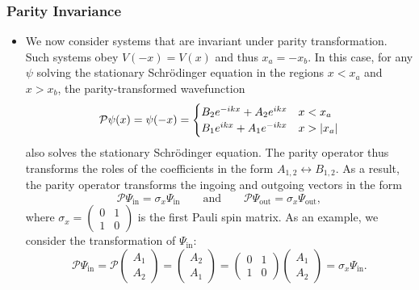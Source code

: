 \documentclass[11pt, a4paper]{article}
\newcommand{\Schro}{Schr\"{o}dinger\xspace}
\newcommand{\Par}{\mathcal{P}}  %
\begin{document}
\subsubsection{Parity Invariance}
\begin{itemize}
    \item We now consider systems that are invariant under parity transformation. Such systems obey $ V(-x) = V(x) $ and thus $ x_{a} = - x_{b} $. In this case, for any $ \psi $ solving the stationary \Schro equation in the regions $ x < x_{a} $ and $ x > x_{b} $, the parity-transformed wavefunction
    \begin{equation*}
        \Par \psi(x) = \psi(-x) = 
        \begin{cases}
            B_{2} e^{-ikx} + A_{2} e^{ikx} & x < x_{a}\\
            B_{1} e^{ikx} + A_{1} e^{-ikx} & x > \abs{x_{a}}
        \end{cases}
    \end{equation*}
    also solves the stationary \Schro equation. The parity operator thus transforms the roles of the coefficients in the form $ A_{1,2} \longleftrightarrow B_{1,2} $. As a result, the parity operator transforms the ingoing and outgoing vectors in the form
    \begin{equation*}
        \Par \Psi_{\text{in}} = \sigma_{x} \Psi_{\text{in}} \qquad \text{and} \qquad \Par \Psi_{\text{out}} = \sigma_{x}\Psi_{\text{out}},
    \end{equation*}
    where $ \sigma_{x} = \begin{pmatrix}
        0 & 1\\
        1 & 0
    \end{pmatrix} $ is the first Pauli spin matrix. As an example, we consider the transformation of $ \Psi_{\text{in}} $:
    \begin{equation*}
        \Par \Psi_{\text{in}} = \Par
        \begin{pmatrix}
            A_{1}\\
            A_{2}
        \end{pmatrix}
        = 
        \begin{pmatrix}
            A_{2}\\
            A_{1}
        \end{pmatrix}
        = 
        \begin{pmatrix}
            0 & 1\\
            1 & 0
        \end{pmatrix}
        \begin{pmatrix}
            A_{1}\\
            A_{2}
        \end{pmatrix}
        = \sigma_{x} \Psi_{\text{in}}.
    \end{equation*}
    

\end{itemize}
\end{document}

